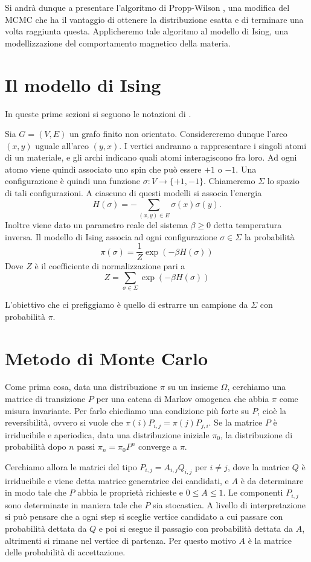 \documentclass[]{marticle}
\begin{document}
Si andr\`a dunque a presentare l'algoritmo di Propp-Wilson \cite{propp-wilson}
\cite{haggstrom}, una modifica del MCMC che ha il vantaggio di ottenere la
distribuzione esatta e di terminare una volta raggiunta questa. Applicheremo
tale algoritmo al modello di Ising, una modellizzazione del comportamento
magnetico della materia.

\section{Il modello di Ising}

In queste prime sezioni si seguono le notazioni di \cite{bremaud}.

Sia $G=(V,E)$ un grafo finito non orientato. Considereremo dunque l'arco $(x,y)$
uguale all'arco $(y,x)$. I vertici andranno a rappresentare i singoli atomi di
un materiale, e gli archi indicano quali atomi interagiscono fra loro. Ad ogni
atomo viene quindi associato uno spin che pu\`o essere $+1$ o $-1$. Una
configurazione \`e quindi una funzione $\sigma\colon V \rightarrow \{+1, -1\}$.
Chiameremo $\Sigma$ lo spazio di tali configurazioni.  A ciascuno di questi
modelli si associa l'energia 
\[
    H(\sigma) = -\sum_{(x,y)\in E} \sigma(x)\sigma(y).
\]
Inoltre viene dato un parametro reale del sistema $\beta \geq 0$ detta
temperatura inversa. Il modello di Ising associa ad ogni configurazione $\sigma
\in \Sigma$ la probabilit\`a
\[
    \pi(\sigma) = \frac{1}{Z} \exp(-\beta H(\sigma))
\]
Dove $Z$ \`e il coefficiente di normalizzazione pari a
\[
    Z = \sum_{\sigma \in \Sigma} \exp(-\beta H(\sigma))
\]

L'obiettivo che ci prefiggiamo \`e quello di estrarre un campione da
$\Sigma$ con probabilit\`a $\pi$.

\section{Metodo di Monte Carlo}

Come prima cosa, data una distribuzione $\pi$ su un insieme $\Omega$, cerchiamo
una matrice di transizione $P$ per una catena di Markov omogenea che abbia
$\pi$ come misura invariante. Per farlo chiediamo una condizione pi\`u forte su
$P$, cio\`e la reversibilit\`a, ovvero si vuole che $\pi (i)P_{i,j}=\pi
(j)P_{j,i}$. Se la matrice $P$ \`e irriducibile e aperiodica, data una
distribuzione iniziale $\pi_0$, la distribuzione di probabilit\`a dopo $n$ passi
$\pi_n = \pi_0 P^n$ converge a $\pi$.

Cerchiamo allora le matrici del tipo $P_{i,j} = A_{i,j} Q_{i,j}$ per $i\neq j$,
dove la matrice $Q$ \`e irriducibile e viene detta matrice generatrice dei
candidati, e $A$ \`e da determinare in modo tale che $P$ abbia le propriet\`a
richieste e $0\leq A \leq 1$. Le componenti $P_{i,j}$ sono determinate in
maniera tale che $P$ sia stocastica.  A livello di interpretazione si pu\`o
pensare che a ogni step si sceglie vertice candidato a cui passare con
probabilit\`a dettata da $Q$ e poi si esegue il passagio con probabilit\`a
dettata da $A$, altrimenti si rimane nel vertice di partenza. Per questo motivo
$A$ \`e la matrice delle probabilit\`a di accettazione. 
\end{document}
